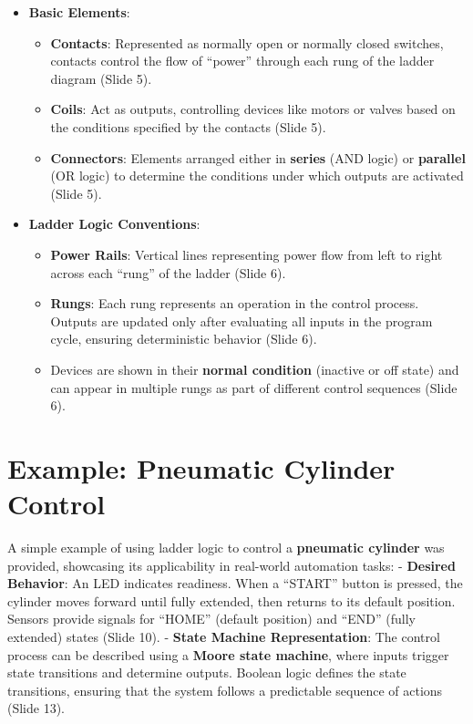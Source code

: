 \documentclass[
  14pt,
  a4paper,
  numbers=noendperiod,
  headinclude=true,
  footinclude=true,
  DIV=calc]{scrreprt}
\providecommand{\tightlist}{%
  \setlength{\itemsep}{0pt}\setlength{\parskip}{0pt}}\usepackage{longtable,booktabs,array}
\begin{document}
\begin{itemize}
\tightlist
\item
  \textbf{Basic Elements}:

  \begin{itemize}
  \tightlist
  \item
    \textbf{Contacts}: Represented as normally open or normally closed
    switches, contacts control the flow of ``power'' through each rung
    of the ladder diagram (Slide 5).
  \item
    \textbf{Coils}: Act as outputs, controlling devices like motors or
    valves based on the conditions specified by the contacts (Slide 5).
  \item
    \textbf{Connectors}: Elements arranged either in \textbf{series}
    (AND logic) or \textbf{parallel} (OR logic) to determine the
    conditions under which outputs are activated (Slide 5).
  \end{itemize}
\item
  \textbf{Ladder Logic Conventions}:

  \begin{itemize}
  \tightlist
  \item
    \textbf{Power Rails}: Vertical lines representing power flow from
    left to right across each ``rung'' of the ladder (Slide 6).
  \item
    \textbf{Rungs}: Each rung represents an operation in the control
    process. Outputs are updated only after evaluating all inputs in the
    program cycle, ensuring deterministic behavior (Slide 6).
  \item
    Devices are shown in their \textbf{normal condition} (inactive or
    off state) and can appear in multiple rungs as part of different
    control sequences (Slide 6).
  \end{itemize}
\end{itemize}

\section{Example: Pneumatic Cylinder
Control}\label{example-pneumatic-cylinder-control}

A simple example of using ladder logic to control a \textbf{pneumatic
cylinder} was provided, showcasing its applicability in real-world
automation tasks: - \textbf{Desired Behavior}: An LED indicates
readiness. When a ``START'' button is pressed, the cylinder moves
forward until fully extended, then returns to its default position.
Sensors provide signals for ``HOME'' (default position) and ``END''
(fully extended) states (Slide 10). - \textbf{State Machine
Representation}: The control process can be described using a
\textbf{Moore state machine}, where inputs trigger state transitions and
determine outputs. Boolean logic defines the state transitions, ensuring
that the system follows a predictable sequence of actions (Slide 13).
\end{document}

